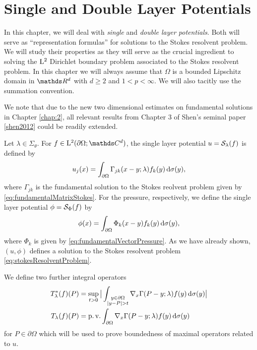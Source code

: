 \chapter{Single and Double Layer Potentials}
\label{chap:3}

In this chapter, we will deal with \emph{single} and \emph{double layer potentials}.
Both will serve as ``representation formulas'' for solutions to the Stokes resolvent problem.
We will study their properties as they will serve as the crucial ingredient to solving the $\mathrm{L}^2$ Dirichlet boundary problem associated to the Stokes resolvent problem.
In this chapter we will always assume that $\Omega$ is a bounded Lipschitz domain in $\R^d$ with $d \geq 2$ and $1 < p < \infty$.
We will also tacitly use the summation convention.

We note that due to the new two dimensional estimates on fundamental solutions in Chapter \ref{chap:2}, all relevant results from Chapter 3 of Shen's seminal paper \ref{shen2012} could be readily extended.

Let $\lambda \in \Sigma_\theta$. 
For $f \in \Ell^2(\partial\Omega; \C^d)$, the single layer potential $u = \mathcal{S}_\lambda(f)$ is defined by
\begin{align}
  \label{eq:defSingleLayer}
  u_j(x) 
  = \int_{\partial\Omega} \Gamma_{jk}(x - y; \lambda) f_k(y) \, {\operatorname{d}\!{\sigma}}(y),
\end{align}
where $\Gamma_{jk}$ is the fundamental solution to the Stokes reolvent problem given by \eqref{eq:fundamentalMatrixStokes}.
For the pressure, respectively, we define the single layer potential $\phi = \mathcal{S}_\Phi(f)$ by
\begin{align}
  \label{eq:defSingleLayerPressure}
  \phi(x) = \int_{\partial\Omega} \Phi_k(x - y) f_k(y) \, {\operatorname{d}\!{\sigma}}(y),
\end{align}
where $\Phi_k$ is given by \eqref{eq:fundamentalVectorPressure}.
As we have already shown, $(u,\phi)$ defines a solution to the Stokes resolvent problem \eqref{eq:stokesResolventProblem}.

We define two further integral operators
\begin{align}
  T_\lambda^*(f)(P) &= \sup_{t > 0} \big| \int_{\substack{y \in \partial\Omega \\ |y - P| > t}} \nabla_x \Gamma(P - y; \lambda) f(y) \, {\operatorname{d}\!{\sigma}}(y) \big| \label{eq:supTOperator}\\
  T_\lambda(f)(P) &= \operatorname{p. v.} \int_{\partial\Omega} \nabla_x \Gamma(P - y; \lambda) f(y) \, {\operatorname{d}\!{\sigma}}(y) \label{eq:pvTOperator}
\end{align}
for $P \in \partial\Omega$ which will be used to prove boundedness of maximal operators related to $u$.


